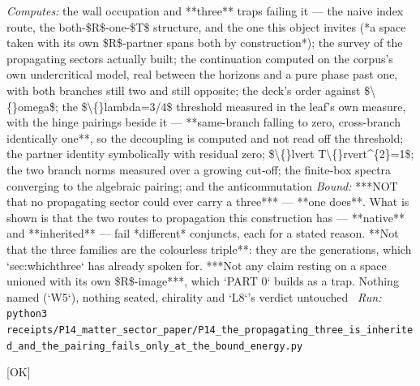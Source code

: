 \begin{description}
\emph{Computes:} the wall occupation and **three** traps failing it --- the naive index route, the both-\$R\$-one-\$T\$ structure, and the one this object invites (*a space taken with its own \$R\$-partner spans both by construction*); the survey of the propagating sectors actually built; the continuation computed on the corpus's own undercritical model, real between the horizons and a pure phase past one, with both branches still two and still opposite; the deck's order against \$\textbackslash\{\}omega\$; the \$\textbackslash\{\}lambda=3/4\$ threshold measured in the leaf's own measure, with the hinge pairings beside it --- **same-branch falling to zero, cross-branch identically one**, so the decoupling is computed and not read off the threshold; the partner identity symbolically with residual zero; \$\textbackslash\{\}lvert T\textbackslash\{\}rvert\textasciicircum{}\{2\}=1\$; the two branch norms measured over a growing cut-off; the finite-box spectra converging to the algebraic pairing; and the anticommutation
 \emph{Bound:}  ***NOT that no propagating sector could ever carry a three*** --- **one does**. What is shown is that the two routes to propagation this construction has --- **native** and **inherited** --- fail *different* conjuncts, each for a stated reason. **Not that the three families are the colourless triple**: they are the generations, which `sec:whichthree` has already spoken for. ***Not any claim resting on a space unioned with its own \$R\$-image***, which `PART 0` builds as a trap. Nothing named (`W5`), nothing seated, chirality and `L8`'s verdict untouched
\ \emph{Run:} \texttt{python3 receipts/P14\_matter\_sector\_paper/P14\_the\_propagating\_three\_is\_inherited\_and\_the\_pairing\_fails\_only\_at\_the\_bound\_energy.py}
\item[\rcptlabel{P14_the_three_and_both_eigenvalues_are_obstructed_by_the_binding_itself}{P14R83}\textbf{P14R83}\quad\texttt{P14\_the\_three\_and\_both\_eigenvalues\_are\_obstructed\_by\_the\_binding\_itself}]\hfill\textsf{[OK]}\\

\end{description}
